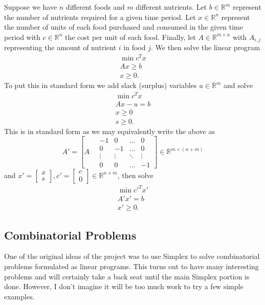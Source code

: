 \documentclass[12pt]{amsart}
\begin{document}
Suppose we have $n$ different foods and $m$ different nutrients. Let
$b\in\mathbb{R}^m$ represent the number of nutrients required for a given time
period. Let $x\in\mathbb{R}^n$ represent the number of units of each food
purchased and consumed in the given time period with $c\in\mathbb{R}^n$ the cost
per unit of each food.
Finally, let $A\in\mathbb{R}^{m\times n}$ with $A_{i,j}$ representing the amount
of nutrient $i$ in food $j$. We then solve the linear program
\begin{align*}
\min c^Tx\\
Ax\ge b\\
x\ge 0.
\end{align*}
To put this in standard form we add slack (surplus) variables $u\in\mathbb{R}^m$
and solve
\begin{align*}
\min c^Tx\\
Ax - u= b\\
x\ge 0\\
s\ge 0.
\end{align*}
This is in standard form as we may equivalently write the above as
\[
	A'=\left[A\quad\begin{array}{llll}-1 &0 &\ldots & 0\\
							 0 & -1 & \ldots & 0\\
							 \vdots & \vdots &\ddots & \vdots\\
							 0 & 0 & \ldots & -1
			  \end{array}\right]\in\mathbb{R}^{m\times (n+m)}
\]
and
$x'=\begin{bmatrix}x\\s\end{bmatrix},c'=\begin{bmatrix}c\\0\end{bmatrix}
\in\mathbb{R}^{n+m}$, then solve
\begin{align*}
\min c'^Tx'\\
A'x'= b\\
x'\ge 0.
\end{align*}

\subsection{Combinatorial Problems}

One of the original ideas of the project was to use Simplex to solve
combinatorial problems formulated as linear programs. This turns out to have
many interesting problems and will certainly take a back seat until the main
Simplex portion is done. However, I don't imagine it will be too much work to
try a few simple examples.
\end{document}
